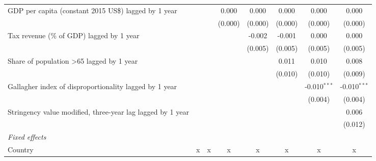 \begin{tabular}{lccccccc}
   GDP per capita (constant 2015 US\$) lagged by 1 year                                     &         &              & 0.000         & 0.000        & 0.000        & 0.000          & 0.000\\   
                                                                                            &         &              & (0.000)       & (0.000)      & (0.000)      & (0.000)        & (0.000)\\   
   Tax revenue (\% of GDP) lagged by 1 year                                                 &         &              &               & -0.002       & -0.001       & 0.000          & 0.000\\   
                                                                                            &         &              &               & (0.005)      & (0.005)      & (0.005)        & (0.005)\\   
   Share of population >65 lagged by 1 year                                                 &         &              &               &              & 0.011        & 0.010          & 0.008\\   
                                                                                            &         &              &               &              & (0.010)      & (0.010)        & (0.009)\\   
   Gallagher index of disproportionality lagged by 1 year                                   &         &              &               &              &              & -0.010$^{***}$ & -0.010$^{***}$\\   
                                                                                            &         &              &               &              &              & (0.004)        & (0.004)\\   
   Stringency value modified, three-year lag lagged by 1 year                               &         &              &               &              &              &                & 0.006\\   
                                                                                            &         &              &               &              &              &                & (0.012)\\   
   \emph{Fixed effects}\\
   Country                                                                                  & x       & x            & x             & x            & x            & x              & x\\  

\end{tabular}
